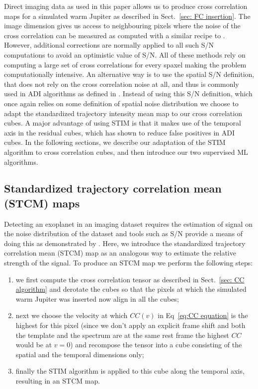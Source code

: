 \documentclass{aa}
\begin{document}
Direct imaging data as used in this paper allows us to produce cross correlation maps for a simulated warm Jupiter as described in Sect.~\ref{sec: FC insertion}.
The image dimension gives us access to neighbouring pixels where the noise of the cross correlation can be measured as computed with a similar recipe to \citet{2022Patapis}.
However, additional corrections are normally applied to all such S/N computations to avoid an optimistic value of S/N.
All of these methods rely on computing a large set of cross correlations for every spaxel making the problem computationally intensive.
An alternative way is to use the spatial S/N definition, that does not rely on the cross correlation noise at all, and thus is commonly used in ADI algorithms as defined in \citet{2014MawetSNR}.
Instead of using this S/N definition, which once again relies on some definition of spatial noise distribution we choose to adapt the standardized trajectory intensity mean \citep[STIM,][]{2019Pairet} map to our cross correlation cubes. 
A major advantage of using STIM is that it makes use of the temporal axis in the residual cubes, which has shown to reduce false positives in ADI cubes.
In the following sections, we describe our adaptation of the STIM algorithm to cross correlation cubes, and then introduce our two supervised ML algorithms.

\subsection{Standardized trajectory correlation mean (STCM) maps}

Detecting an exoplanet in an imaging dataset requires the estimation of signal on the noise distribution of the dataset and tools such as S/N provide a means of doing this as demonstrated by \citet{2014MawetSNR}.
Here, we introduce the standardized trajectory correlation mean (STCM) map as an analogous way to estimate the relative strength of the signal. To produce an STCM map we perform the following steps:
\begin{enumerate}
    \item we first compute the cross correlation tensor as described in Sect.~\ref{sec: CC algorithm} and derotate the cubes so that the pixels at which the simulated warm Jupiter was inserted now align in all the cubes;
    \item next we choose the velocity at which $CC(v)$ in Eq~\ref{eq:CC equation} is the highest for this pixel (since we don't apply an explicit frame shift and both the template and the spectrum are at the same rest frame the highest $CC$ would be at $v=0$) and recompose the tensor into a cube consisting of the spatial and the temporal dimensions only;
    \item finally the STIM algorithm is applied to this cube along the temporal axis, resulting in an STCM map.
\end{enumerate}
\end{document}
